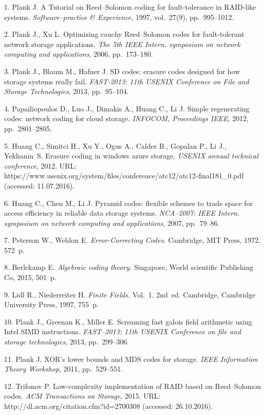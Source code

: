 {\footnotesize

\vskip 3mm


\vskip 2mm


1. Plank J. A Tutorial on Reed--Solomon coding for fault-tolerance
in RAID-like systems. \emph{Software--practice \& Experience},
1997, vol.~27(9), pp.~995--1012.

2. Plank J., Xu L. Optimizing cauchy Reed--Solomon codes for
fault-tolerant network storage applications. \emph{The 5th IEEE
Intern. symposium on network computing and applications}, 2006,
pp.~173--180.

3. Plank J., Blaum M., Hafner J. SD codes: erasure codes designed
for how storage systems really fail.  \emph{FAST-2013: 11th USENIX
Conference on File and Storage Technologies}, 2013, pp.~95--104.

4. Papailiopoulos D., Luo J., Dimakis A., Huang C., Li J. Simple
regenerating codes: network coding for cloud storage.
\emph{INFOCOM, Proceedings IEEE}, 2012, pp.~2801--2805.

5. Huang C., Simitci H., Xu Y., Ogus A., Calder B., Gopalan P., Li
J., Yekhanin~S. Erasure coding in windows azure storage.
\emph{USENIX annual technical conference}, 2012. URL:
https://www.usenix.org/system/files/conference/atc12/atc12-final181\_0.pdf
(accessed: 11.07.2016).

6. Huang C., Chen M., Li J. Pyramid codes: flexible schemes to
trade space for access efficiency in reliable data storage
systems. \emph{NCA--2007: IEEE Intern. symposium on network
computing and applications}, 2007, pp.~79--86.

7. Peterson W., Weldon E.  \emph{Error-Correcting Codes.}
Cambridge, MIT Press, 1972, 572~p.

8. Berlekamp E. \emph{Algebraic coding theory.} Singapore, World
scientific Publishing Co, 2015, 501~p.

9. Lidl R., Niederreiter H. \emph{Finite Fields.} Vol.~1. 2nd~ed.
Cambridge, Cambridge University Press, 1997, 755~p.

10. Plank J., Greenan K., Miller E. Screaming fast galois field
arithmetic using Intel SIMD instructions. \emph{FAST--2013: 11th
USENIX Conference on file and storage technologies}, 2013,
pp.~299--306.

11. Plank J. XOR's lower bounds and MDS codes for storage.
\emph{IEEE Information Theory Workshop}, 2011, pp.~529--551.


12. Trifonov P. Low-complexity implementation of RAID based on
Reed--Solomon codes.  \emph{ACM Transactions on Storage}, 2015.
URL: http://dl.acm.org/citation.cfm?id=2700308 (accessed:
26.10.2016).

}
